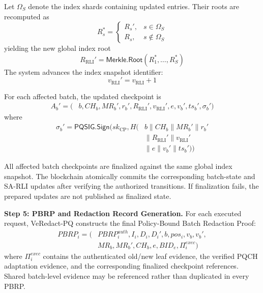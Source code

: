 \documentclass[lettersize,journal]{IEEEtran}
\begin{document}
    Let $\Omega_S$ denote the index shards
    containing updated entries. Their roots
    are recomputed as
    \begin{equation}
    R_s^{*}=
    \begin{cases}
    R_s',&s\in\Omega_S\\
    R_s,&s\notin\Omega_S
    \end{cases}
    \end{equation}
    yielding the new global index root
    \begin{equation}
    R_{\mathrm{RLI}}'=
    \mathsf{Merkle.Root}
    (R_1^{*},\ldots,R_S^{*})
    \end{equation}
    The system advances the index snapshot
    identifier:
    \begin{equation}
    v_{\mathrm{RLI}}'
    =v_{\mathrm{RLI}}+1
    \end{equation}
    
    For each affected batch, the updated
    checkpoint is
    \begin{equation}
    \begin{aligned}
    A_b'=\big(&b,CH_b,MR_b', {r_b',}
    R_{\mathrm{RLI}}',v_{\mathrm{RLI}}',e,v_b',
    ts_b',\sigma_b'\big)
    \end{aligned}
    \end{equation}
    where
    \begin{equation}
    \begin{aligned}
    \sigma_b'=
    \mathsf{PQSIG.Sign}\big(
    sk_{\mathrm{CP}},
    H(&b\parallel CH_b\parallel MR_b' {\parallel r_b'}\\
    &\parallel R_{\mathrm{RLI}}'\parallel v_{\mathrm{RLI}}'\\
    &\parallel e\parallel v_b'\parallel ts_b')\big)
    \end{aligned}
    \end{equation}
    
    All affected batch checkpoints are finalized
    against the same global index snapshot.
    The blockchain atomically commits the
    corresponding batch-state and SA-RLI updates
    after verifying the authorized transitions.
    If finalization fails, the prepared updates
    are not published as finalized state.
    
    \medskip
    \noindent\textbf{Step 5: PBRP and Redaction
    Record Generation.}
    For each executed request, VeRedact-PQ
    constructs the final Policy-Bound Batch
    Redaction Proof:
    \begin{equation}
    \begin{aligned}
    PBRP_i=\big(
    &PBRP_i^{auth},I_i,D_i,D_i',b,pos_i,v_b,v_b',\\&MR_b,MR_b',CH_b,e,BID_e,\Pi_i^{exec}\big)
    \end{aligned}
    \end{equation}
    where $\Pi_i^{exec}$ contains the
    authenticated old/new leaf evidence,
    the verified PQCH adaptation evidence,
    and the corresponding finalized checkpoint
    references. Shared batch-level evidence
    may be referenced rather than duplicated
    in every PBRP.
    
\end{document}
